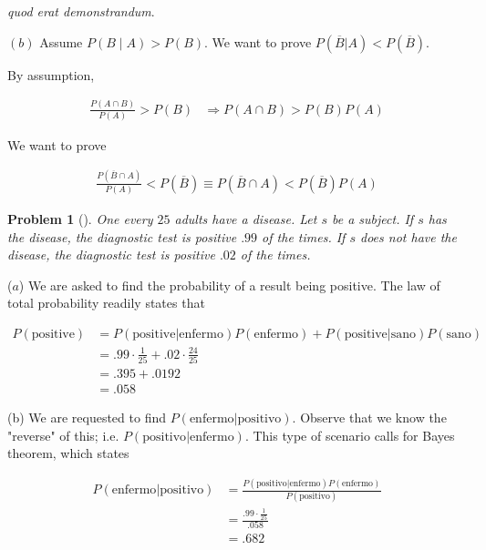 \documentclass[a4paper, 12pt]{article}
\newtheorem{problem}{Problem}
\newtheorem{problem}{Problem}
\begin{document}
   \textit{quod erat demonstrandum}.

   $(b)$ Assume $P(B \mid A) > P(B)$. We want to prove $P(\overline{B} | A) <
   P(\overline{B})$. 

   By assumption,

   \begin{align*}
       \frac{P(A \cap B)}{P(A)} > P(B) &\Rightarrow P(A \cap B) > P(B)P(A)
   \end{align*}


   We want to prove

   \begin{align*}
       \frac{P(\overline{B} \cap A)}{P(A)} < P(\overline{B}) \equiv P(\overline{B} \cap A) < P(\overline{B})P(A)
   \end{align*}

   \pagebreak 

   \begin{problem}[]
       One every $25$ adults have a disease. Let $s$ be a subject. If $s$ has the disease, the diagnostic 
       test is positive $.99$ of the times. If $s$ does not have the disease, the diagnostic test 
       is positive $.02$ of the times.
   \end{problem}

   ($a$) We are asked to find the probability of a result being positive. The law of total 
   probability readily states that

   \begin{align*}
       P(\text{positive}) &= P(\text{positive} | \text{enfermo})P(\text{enfermo}) + P(\text{positive} | \text{sano})P(\text{sano})  \\ 
       &= .99 \cdot \frac{1}{25} + .02 \cdot \frac{24}{25} \\ 
       &= .395 + .0192 \\ 
       &= .058
   \end{align*}

   (b) We are requested to find $P(\text{enfermo} | \text{positivo})$. Observe that we know the 
   "reverse" of this; i.e. $P(\text{positivo} | \text{enfermo})$. This type of 
   scenario calls for Bayes theorem, which states 

   \begin{align*}
       P(\text{enfermo}|\text{positivo}) &= \frac{P(\text{positivo}| \text{enfermo})P(\text{enfermo})}{P(\text{positivo})} \\ 
                                         &= \frac{.99 \cdot \frac{1}{25}}{.058} \\ 
                                         &=.682
   \end{align*}
\end{document}
